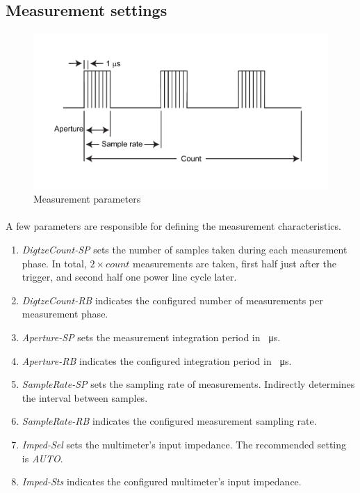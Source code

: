 \documentclass[openany]{article}
\begin{document}
	\subsection{Measurement settings}

		\begin{figure}[!h]
			\caption{Measurement parameters}
			\label{fig:meas-param}
			\centering
			\includegraphics[width=1.0\textwidth]{ict-meas-param-image}
		\end{figure}
\FloatBarrier

		\paragraph{} A few parameters are responsible for defining the measurement characteristics.

			\begin{enumerate}
				\item \emph{DigtzeCount-SP} sets the number of samples taken during each measurement phase. In total, $ 2\times count $ measurements are taken, first half just after the trigger, and second half one power line cycle later.
				\item \emph{DigtzeCount-RB} indicates the configured number of measurements per measurement phase.
				\item \emph{Aperture-SP} sets the measurement integration period in \SI{}{\micro\second}.
				\item \emph{Aperture-RB} indicates the configured integration period in \SI{}{\micro\second}.
				\item \emph{SampleRate-SP} sets the sampling rate of measurements. Indirectly determines the interval between samples.
				\item \emph{SampleRate-RB} indicates the configured measurement sampling rate.
				\item \emph{Imped-Sel} sets the multimeter's input impedance. The recommended setting is \emph{AUTO}.
				\item \emph{Imped-Sts} indicates the configured multimeter's input impedance.
			\end{enumerate}
\end{document}
